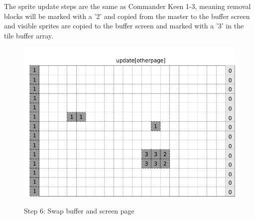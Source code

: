 \documentclass[book.tex]{subfiles}
\begin{document}
\begin{minipage}{.4\textwidth}
The sprite update steps are the same as Commander Keen 1-3, meaning removal blocks will be marked with a '2' and copied from the master to the buffer screen and visible sprites are copied to the buffer screen and marked with a '3' in the tile buffer array.
 \end{minipage}
\begin{minipage}{.6\textwidth}
\begin{figure}[H]
  \centering
 \includegraphics[width=.9\textwidth]{screenshots_300dpi/game/Scroll_KC4_6_1-scroll_update_sprite.png}
 \label{fig:kc4_6_update_array}  
\end{figure}
\end{minipage}

\pagebreak

\begin{figure}[H]
\centering
 \caption{Step 6: Swap buffer and screen page}
 \label{fig:k4_6_update_final}
\end{figure}
\end{document}
